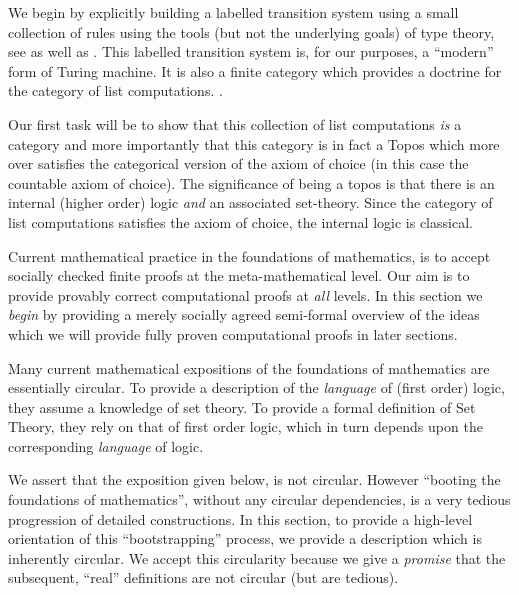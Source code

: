 We begin by explicitly building a labelled transition system using a small
collection of rules using the tools (but not the underlying goals) of type
theory, see \cite[Appendix A.2]{awodeyCoquandVoevodsky2013homotopyTypeTheory} as
well as \cite{jacobs1999categoricalLogicTypeTheory}. This labelled transition
system is, for our purposes, a ``modern'' form of Turing machine. It is also a
finite category which provides a doctrine for the category of list computations.
.

Our first task will be to show that this collection of list computations
\emph{is} a category and more importantly that this category is in fact a Topos
which more over satisfies the categorical version of the axiom of choice (in
this case the countable axiom of choice). The significance of being a topos is
that there is an internal (higher order) logic \emph{and} an associated
set-theory. Since the category of list computations satisfies the axiom of
choice, the internal logic is classical.


Current mathematical practice in the foundations of mathematics, is to accept
socially checked finite proofs at the meta-mathematical level. Our aim is to
provide provably correct computational proofs at \emph{all} levels. In this
section we \emph{begin} by providing a merely socially agreed semi-formal
overview of the ideas which we will provide fully proven computational proofs in
later sections.

Many current mathematical expositions of the foundations of mathematics are
essentially circular. To provide a description of the \emph{language} of (first
order) logic, they assume a knowledge of set theory. To provide a formal
definition of Set Theory, they rely on that of first order logic, which in turn
depends upon the corresponding \emph{language} of logic.

We assert that the exposition given below, is not circular. However ``booting
the foundations of mathematics''\footnotemark, without any circular
dependencies, is a very tedious progression of detailed constructions. In this
section, to provide a high-level orientation of this ``bootstrapping'' process,
we provide a description which is inherently circular. We accept this
circularity because we give a \emph{promise} that the subsequent, ``real''
definitions are not circular (but are tedious).


